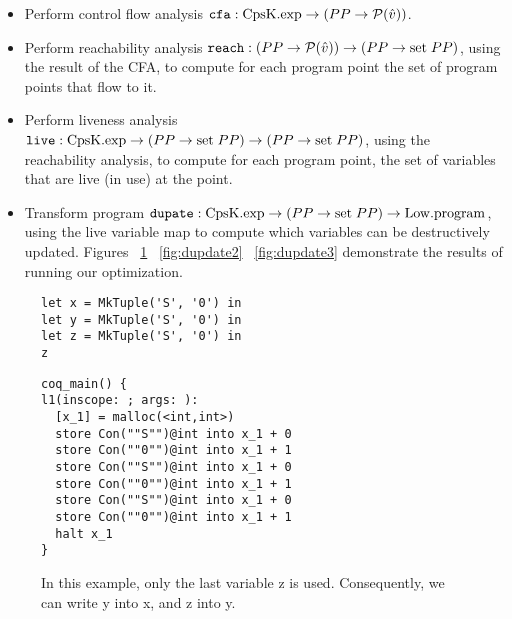 \documentclass{article}
\begin{document}
\begin{itemize}
\item Perform control flow analysis ${\tt cfa} : {\rm CpsK.exp} \rightarrow (PP \rightarrow \mathcal{P}(\hat{v}))$. 
\item Perform reachability analysis ${\tt reach} : (PP \rightarrow \mathcal{P}(\hat{v})) \rightarrow (PP \rightarrow {\rm set} \; PP)$, using the result of the CFA, to compute for each program point the set of program points that flow to it.
\item Perform liveness analysis ${\tt live} : {\rm CpsK.exp} \rightarrow (PP \rightarrow {\rm set} \; PP) \rightarrow (PP \rightarrow {\rm set} \; PP)$, using the reachability analysis, to compute for each program point, the set of variables that are live (in use) at the point.
\item Transform program ${\tt dupate} : {\rm CpsK.exp} \rightarrow (PP \rightarrow {\rm set} \; PP) \rightarrow {\rm Low.program}$, using the live variable map to compute which variables can be destructively updated. Figures ~\ref{fig:dupdate1} ~\ref{fig:dupdate2} ~\ref{fig:dupdate3} demonstrate the results of running our optimization.
\end{itemize}

\begin{figure}
\centering
\begin{minipage}[t]{.4\textwidth}
\begin{lstlisting}
let x = MkTuple('S', '0') in
let y = MkTuple('S', '0') in
let z = MkTuple('S', '0') in
z
\end{lstlisting}
\end{minipage}
\hspace{20pt}
\begin{minipage}[t]{.4\textwidth}
\begin{lstlisting}
coq_main() {
l1(inscope: ; args: ):
  [x_1] = malloc(<int,int>)
  store Con(""S"")@int into x_1 + 0
  store Con(""0"")@int into x_1 + 1
  store Con(""S"")@int into x_1 + 0
  store Con(""0"")@int into x_1 + 1
  store Con(""S"")@int into x_1 + 0
  store Con(""0"")@int into x_1 + 1
  halt x_1
}
\end{lstlisting}
\end{minipage}
\label{fig:dupdate1}
\caption{In this example, only the last variable z is
   used. Consequently, we can write y into x, and z into y. }
\end{figure}
\end{document}

